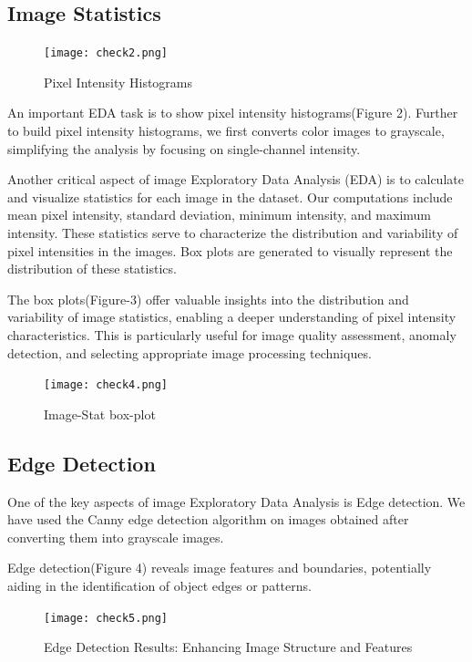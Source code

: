 \documentclass{article}
\begin{document}
\subsection{Image Statistics}

\begin{figure}[h]
  \centering
  \texttt{[image: check2.png]}
  \caption{Pixel Intensity Histograms}
  \label{fig:example}
\end{figure}

An important EDA task is to show pixel intensity histograms(Figure 2). Further to build pixel intensity histograms, we first converts color images to grayscale, simplifying the analysis by focusing on single-channel intensity.


Another critical aspect of image Exploratory Data Analysis (EDA) is to calculate and visualize statistics for each image in the dataset. Our computations include mean pixel intensity, standard deviation, minimum intensity, and maximum intensity. These statistics serve to characterize the distribution and variability of pixel intensities in the images. Box plots are generated to visually represent the distribution of these statistics. 

The box plots(Figure-3) offer valuable insights into the distribution and variability of image statistics, enabling a deeper understanding of pixel intensity characteristics. This is particularly useful for image quality assessment, anomaly detection, and selecting appropriate image processing techniques.
\begin{figure}[h]
  \centering
  \texttt{[image: check4.png]}
  \caption{Image-Stat box-plot}
  \label{fig:example}
\end{figure}

\subsection{Edge Detection}
One of the key aspects of image Exploratory Data Analysis is Edge detection. We have used the Canny edge detection algorithm on images obtained after converting them into grayscale images.

Edge detection(Figure 4) reveals image features and boundaries, potentially aiding in the identification of object edges or patterns.
\begin{figure}[h]
  \centering
  \texttt{[image: check5.png]}
  \caption{Edge Detection Results: Enhancing Image Structure and Features}
  \label{fig:example}
\end{figure}
\end{document}
